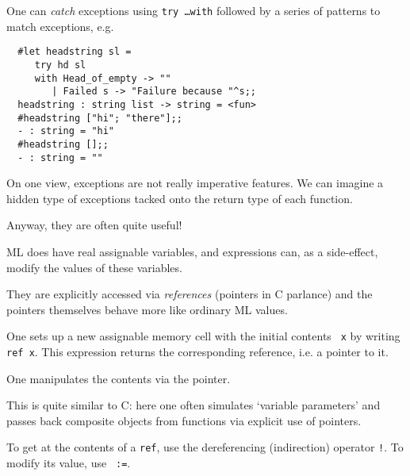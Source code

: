 \begin{slide*}


\vspace*{0.5cm}

One can {\em catch} exceptions using {\black \tt try \ldots with} followed by a
series of patterns to match exceptions, e.g.

\begin{black}\begin{verbatim}
  #let headstring sl =
     try hd sl
     with Head_of_empty -> ""
        | Failed s -> "Failure because "^s;;
  headstring : string list -> string = <fun>
  #headstring ["hi"; "there"];;
  - : string = "hi"
  #headstring [];;
  - : string = ""
\end{verbatim}\end{black}

On one view, exceptions are not really imperative features. We can imagine a
hidden type of exceptions tacked onto the return type of each function.

Anyway, they are often quite useful!

\end{slide*}



\begin{slide*}


\vspace*{0.5cm}

ML does have real assignable variables, and expressions can, as a side-effect,
modify the values of these variables.

They are explicitly accessed via {\em references} (pointers in C parlance) and
the pointers themselves behave more like ordinary ML values.

One sets up a new assignable memory cell with the initial contents {\black \tt
x} by writing {\black \tt ref x}. This expression returns the corresponding
reference, i.e. a pointer to it.

One manipulates the contents via the pointer.

This is quite similar to C: here one often simulates `variable parameters' and
passes back composite objects from functions via explicit use of pointers.

To get at the contents of a {\black \tt ref}, use the dereferencing
(indirection) operator {\black \tt !}. To modify its value, use {\black \tt
:=}.

\end{slide*}





